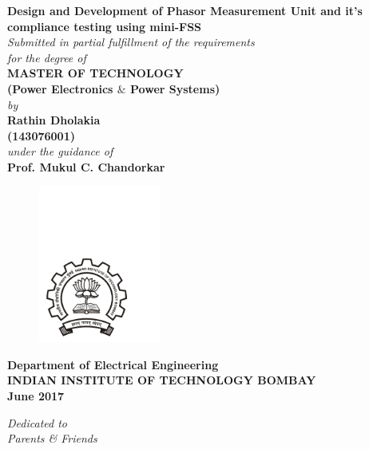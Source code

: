 \thispagestyle{empty}
\begin{center}
\huge
\textbf{Design and Development of Phasor Measurement Unit and it's compliance testing using mini-FSS}\\
\bigskip
\bigskip
\normalsize
\textit{Submitted in partial fulfillment of the requirements\\
                for  the degree of 
 }\\
\vspace*{0.8cm}
\textbf{MASTER OF TECHNOLOGY}\\
\textbf{(Power Electronics $ \& $ Power Systems)}\\
\vspace*{0.8cm}
\textit{by}\\
\vspace*{0.8cm}
\textbf{Rathin Dholakia \\(143076001)}\\
\vspace*{0.8cm}
\textit{under the guidance of}\\
\textbf{Prof. Mukul C. Chandorkar}\\
\vspace*{0.8cm}
\begin{figure}[h!]
 \centering
 \includegraphics[trim=1cm 1cm 5cm 12.5cm, clip=true, width=4cm]{chapter0_initial/logo}
\end{figure}
\bigskip
\bigskip
\large
\textbf{Department of Electrical Engineering}\\
\bigskip
\textbf{INDIAN INSTITUTE OF TECHNOLOGY BOMBAY}\\
\bigskip
\textbf{June 2017}
\end{center}

\normalsize
 



\newpage
\thispagestyle{empty}
\vspace*{200pt}
\begin{center}
 \large

 \textit{
Dedicated to\\
\bigskip
 Parents \& Friends}
\end{center}
\normalsize